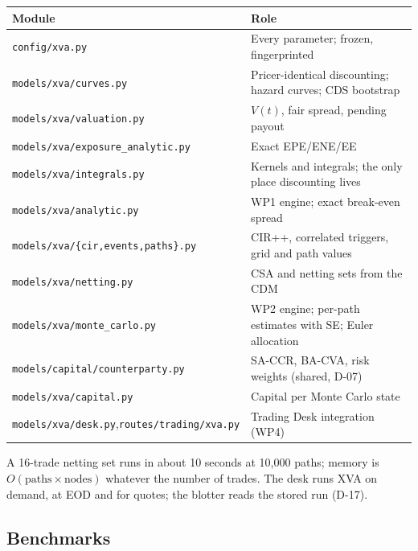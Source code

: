 \documentclass[11pt,a4paper]{article}
\begin{document}
\mkmimplementation

{\small
\begin{longtable}{p{6.4cm}p{8.4cm}}
\toprule
\textbf{Module} & \textbf{Role} \\
\midrule
\texttt{config/xva.py} & Every parameter; frozen, fingerprinted \\
\texttt{models/xva/curves.py} & Pricer-identical discounting; hazard curves; CDS bootstrap \\
\texttt{models/xva/valuation.py} & $V(t)$, fair spread, pending payout \\
\texttt{models/xva/exposure\_analytic.py} & Exact EPE/ENE/EE \\
\texttt{models/xva/integrals.py} & Kernels and integrals; the only place discounting lives \\
\texttt{models/xva/analytic.py} & WP1 engine; exact break-even spread \\
\texttt{models/xva/\{cir,events,paths\}.py} & CIR++, correlated triggers, grid and path values \\
\texttt{models/xva/netting.py} & CSA and netting sets from the CDM \\
\texttt{models/xva/monte\_carlo.py} & WP2 engine; per-path estimates with SE; Euler allocation \\
\texttt{models/capital/counterparty.py} & SA-CCR, BA-CVA, risk weights (shared, D-07) \\
\texttt{models/xva/capital.py} & Capital per Monte Carlo state \\
\texttt{models/xva/desk.py},\newline\texttt{routes/trading/xva.py} & Trading Desk integration (WP4) \\
\bottomrule
\end{longtable}}

A 16-trade netting set runs in about 10 seconds at 10{,}000 paths; memory is
$O(\text{paths}\times\text{nodes})$ whatever the number of trades. The desk
runs XVA on demand, at EOD and for quotes; the blotter reads the stored run
(D-17).

\mkmvalidation

\subsection{Benchmarks}

\end{document}
